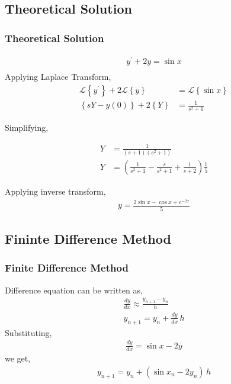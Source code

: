 \documentclass{beamer}
\providecommand{\brak}[1]{\ensuremath{\left(#1\right)}}
\providecommand{\cbrak}[1]{\ensuremath{\left\{#1\right\}}}
\theoremstyle{remark}
\numberwithin{equation}{section}
\begin{document}
\subsection{Theoretical Solution}
\begin{frame}[allowframebreaks]
    \frametitle{Theoretical Solution}
    \begin{align}
        y^\prime + 2y = \sin{x}\\
    \end{align}
    Applying Laplace Transform,
    \begin{align}
        \mathcal{L}\cbrak{y^\prime} + 2\mathcal{L}\cbrak{y} &= \mathcal{L}\cbrak{\sin{x}}\\
        \cbrak{sY-y(0)} + 2 \cbrak{Y} &= \frac{1}{s^2 + 1}
    \end{align}

    Simplifying,

    \begin{align}
        Y &= \frac{1}{(s+1)(s^2+1)}\\
        Y &= \brak{\frac{1}{s^2 + 1}- \frac{s}{s^2+1} + \frac{1}{s+2}}\frac{1}{5}
    \end{align}

    Applying inverse transform,
    \begin{align}
        y = \frac{2\sin{x}-\cos{x}+e^{-2x}}{5}
    \end{align}
\end{frame}

\subsection{Fininte Difference Method}
\begin{frame}
\frametitle{Finite Difference Method}
    Difference equation can be written as,
    \begin{align}
        \frac{dy}{dx} \approx \frac{y_{n+1}-y_n}{h}\\
        y_{n+1} = y_n + \frac{dy}{dx}\, h
    \end{align}
    Substituting,
    \begin{align}
        \frac{dy}{dx} = \sin{x} - 2y
    \end{align}
    we get,
    \begin{align}
        y_{n+1} = y_n + \brak{\sin{x_n} - 2y_n}\,h
    \end{align}
\end{frame}
\end{document}
